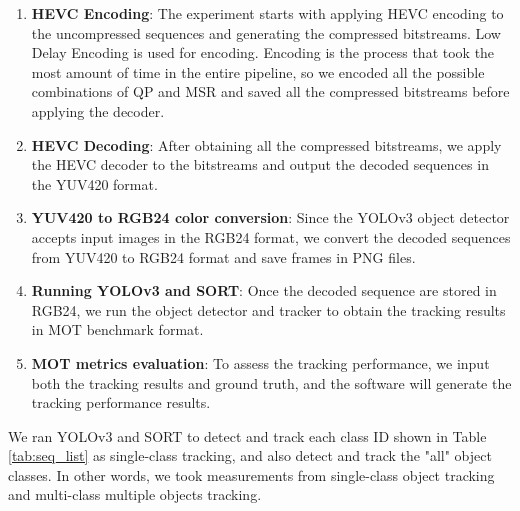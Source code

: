 \begin{enumerate}
    \item \textbf{HEVC Encoding}: The experiment starts with applying HEVC encoding to the uncompressed sequences and generating the compressed bitstreams. Low Delay Encoding is used for encoding. Encoding is the process that took the most amount of time in the entire pipeline, so we encoded all the possible combinations of QP and MSR and saved all the compressed bitstreams before applying the decoder.
    \item \textbf{HEVC Decoding}: After obtaining all the compressed bitstreams, we apply the HEVC decoder to the bitstreams and output the decoded sequences in the YUV420 format.
    \item \textbf{YUV420 to RGB24 color conversion}: Since the YOLOv3 object detector accepts input images in the RGB24 format, we convert the decoded sequences from YUV420 to RGB24 format and save frames in PNG files.
    \item \textbf{Running YOLOv3 and SORT}: Once the decoded sequence are stored in RGB24, we run the object detector and tracker to obtain the tracking results in MOT benchmark format. 
    \item \textbf{MOT metrics evaluation}: To assess the tracking performance, we input both the tracking results and ground truth, and the software \cite{heindl_cheindpy-motmetrics_2021} will generate the tracking performance results.
\end{enumerate}
We ran YOLOv3 and SORT to detect and track each class ID shown in Table \ref{tab:seq_list} as single-class tracking, and also detect and track the "all" object classes. In other words, we took measurements from single-class object tracking and multi-class multiple objects tracking.

